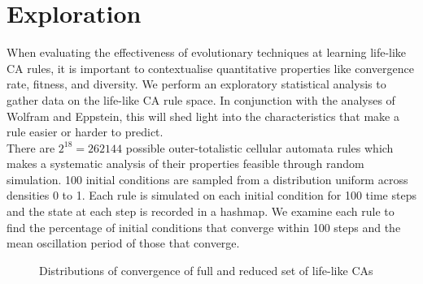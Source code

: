 \section{Exploration}

When evaluating the effectiveness of evolutionary techniques at learning life-like CA rules, it is important to contextualise quantitative properties like convergence rate, fitness, and diversity. We perform an exploratory statistical analysis to gather data on the life-like CA rule space. In conjunction with the analyses of Wolfram\cite{wolfram1986theory} and Eppstein\cite{eppstein2010growth}, this will shed light into the characteristics that make a rule easier or harder to predict.\\

There are $2^{18} = 262144$ possible outer-totalistic cellular automata rules which makes a systematic analysis of their properties feasible through random simulation. 100 initial conditions are sampled from a distribution uniform across densities 0 to 1. Each rule is simulated on each initial condition for 100 time steps and the state at each step is recorded in a hashmap. We examine each rule to find the percentage of initial conditions that converge within 100 steps and the mean oscillation period of those that converge.\\   

\begin{figure}[!h]
\centering
            \hfill
            \hfill
            \caption{Distributions of convergence of full and reduced set of life-like CAs}
\label{fig:taxonomy-dist}
\end{figure}

